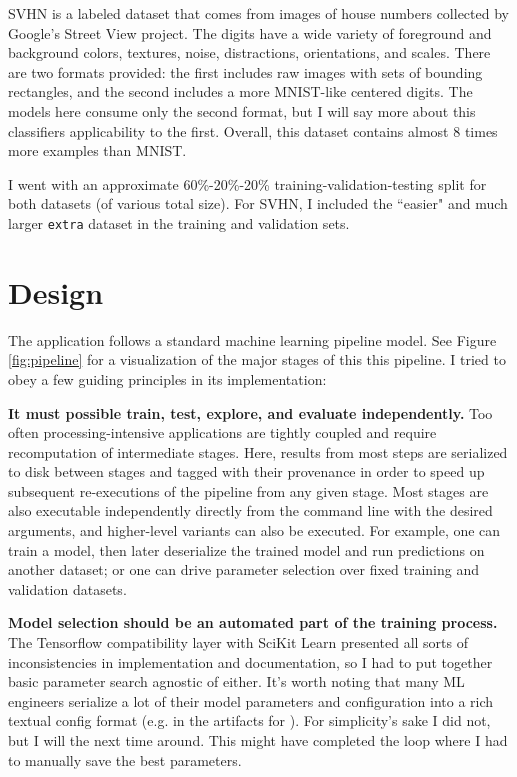 \documentclass{article}
\begin{document}
SVHN is a labeled dataset that comes from images of house numbers collected by Google's Street View project. The digits have a wide variety of foreground and background colors, textures, noise, distractions, orientations, and scales. There are two formats provided: the first includes raw images with sets of bounding rectangles, and the second includes a more MNIST-like centered digits. The models here consume only the second format, but I will say more about this classifiers applicability to the first. Overall, this dataset contains almost 8 times more examples than MNIST.

I went with an approximate 60\%-20\%-20\% training-validation-testing split for both datasets (of various total size). For SVHN, I included the ``easier" and much larger \texttt{extra} dataset in the training and validation sets.

\section{Design}

The application follows a standard machine learning pipeline model. See Figure \ref{fig:pipeline} for a visualization of the major stages of this this pipeline. I tried to obey a few guiding principles in its implementation: 

\textbf{It must possible train, test, explore, and evaluate independently.} Too often processing-intensive applications are tightly coupled and require recomputation of intermediate stages. Here, results from most steps are serialized to disk between stages and tagged with their provenance in order to speed up subsequent re-executions of the pipeline from any given stage. Most stages are also executable independently directly from the command line with the desired arguments, and higher-level variants can also be executed.  For example, one can train a model, then later deserialize the trained model and run predictions on another dataset; or one can drive parameter selection over fixed training and validation datasets.

\textbf{Model selection should be an automated part of the training process.} The Tensorflow \cite{tensorflow2015-whitepaper} compatibility layer with SciKit Learn \cite{scikit-learn} presented all sorts of inconsistencies in implementation and documentation, so I had to put together basic parameter search agnostic of either. It's worth noting that many ML engineers serialize a lot of their model parameters and configuration into a rich textual config format (e.g. in the artifacts for \cite{krizhevsky2012imagenet}). For simplicity's sake I did not, but I will the next time around. This might have completed the loop where I had to manually save the best parameters.
\end{document}
